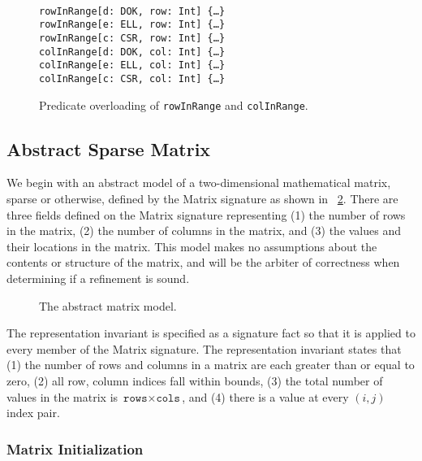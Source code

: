 \begin{figure}
\centering
\begin{myquote}\small{\texttt{\\
\Bpred rowInRange[d: DOK, row: Int] \{\ldots\}\\
\Bpred rowInRange[e: ELL, row: Int] \{\ldots\}\\
\Bpred rowInRange[c: CSR, row: Int] \{\ldots\}\\
\Bpred colInRange[d: DOK, col: Int] \{\ldots\}\\
\Bpred colInRange[e: ELL, col: Int] \{\ldots\}\\
\Bpred colInRange[c: CSR, col: Int] \{\ldots\}\\
}}
\end{myquote}
\caption{Predicate overloading of \texttt{rowInRange} and \texttt{colInRange}.}
\label{fig:overload}
\end{figure}

\subsection{Abstract Sparse Matrix}

We begin with an abstract model of a two-dimensional mathematical matrix, sparse or otherwise, defined by the Matrix signature as shown in \figurename~\ref{model:abstract}.  There are three fields defined on the Matrix signature representing (1) the number of rows in the matrix, (2) the number of columns in the matrix, and (3) the values and their locations in the matrix.  This model makes no assumptions about the contents or structure of the matrix, and will be the arbiter of correctness when determining if a refinement is sound.

\begin{figure}
\centering

\caption{The abstract matrix model.}
\label{model:abstract}
\end{figure}

The representation invariant is specified as a signature fact so that it is applied to every member of the Matrix signature.  The representation invariant states that (1) the number of rows and columns in a matrix are each greater than or equal to zero, (2) all row, column indices fall within bounds, (3) the total number of values in the matrix is $\texttt{rows}\times\texttt{cols}$, and (4) there is a value at every $\left(i, j\right)$ index pair.

\subsubsection{Matrix Initialization}


